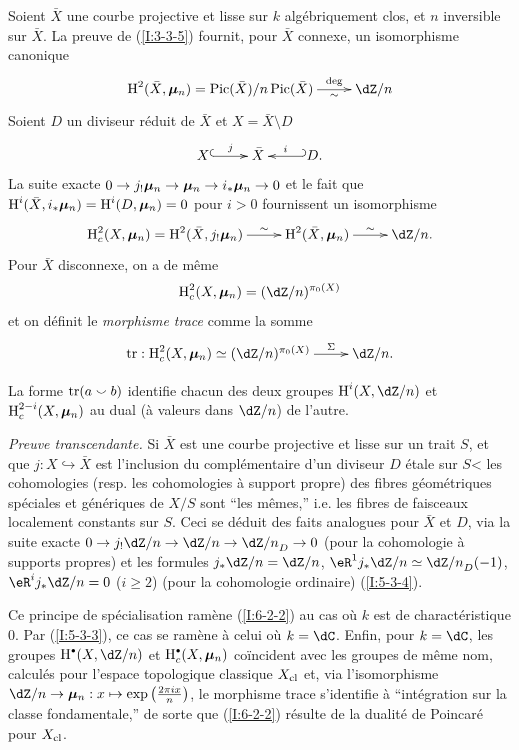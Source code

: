 \subsubsection{}\label{I:6-2-1}

Soient $\bar X$ une courbe projective et lisse sur $k$ algébriquement clos, et 
$n$ inversible sur $\bar X$. La preuve de (\ref{I:3-3-5}) fournit, pour 
$\bar X$ connexe, un isomorphisme canonique 
\[\xymatrix{
  \h^2(\bar X,\dmu_n) = \pic(\bar X)/n\pic(\bar X) \ar[r]^-{\deg}_-{\sim}
    & \dZ/n
}\]
Soient $D$ un diviseur réduit de $\bar X$ et $X=\bar X\setminus D$ 
\[\xymatrix{
  X \ar@{^{(}->}[r]^-j 
    & \bar X 
    & \ar@{_{(}->}[l]_-i D \text{.}
}\]
La suite exacte $0\to j_! {\bm\mu}_n \to {\bm\mu}_n\to i_* {\bm\mu}_n\to 0$ et le fait que 
$\operatorname{H}^i(\bar X,i_*{\bm\mu}_n) = \operatorname{H}^i(D,{\bm\mu}_n)=0$ pour $i>0$ fournissent un 
isomorphisme 
\[\xymatrix{
  \h_c^2(X,\dmu_n) = \h^2(\bar X,j_! \dmu_n) \ar[r]^-\sim 
    & \h^2(\bar X,\dmu_n) \ar[r]^-\sim 
    & \dZ/n \text{.}
}\]
Pour $\bar X$ disconnexe, on a de même 
\[
  \h_c^2(X,\dmu_n) = (\dZ/n)^{\pi_0(X)}
\]
et on définit le \emph{morphisme trace} comme la somme 
\[\xymatrix{
  \tr : \h_c^2(X,\dmu_n) \simeq (\dZ/n)^{\pi_0(X)} \ar[r]^-\Sigma
    & \dZ/n\text{.}
}\]





\begin{theorem}\label{I:6-2-2}
La forme $\operatorname{tr}(a\smallsmile b)$ identifie chacun des deux groupes $\h^i(X,\dZ/n)$ 
et $\operatorname{H}_c^{2-i}(X,{\bm\mu}_n)$ au dual (à valeurs dans $\dZ/n$) de l'autre. 
\end{theorem}

\emph{Preuve transcendante.} Si $\bar X$ est une courbe projective et lisse sur 
un trait $S$, et que $j:X\hookrightarrow \bar X$ est l'inclusion du 
complémentaire d'un diviseur $D$ étale sur $S$< les cohomologies (resp. 
les cohomologies à support propre) des fibres géométriques spéciales et 
génériques de $X/S$ sont ``les mêmes,'' i.e. les fibres de faisceaux 
localement constants sur $S$. Ceci se déduit des faits analogues pour 
$\bar X$ et $D$, via la suite exacte $0\to j_! \dZ/n\to\dZ/n\to {\dZ/n}_D\to 0$ 
(pour la cohomologie à supports propres) et les formules $j_*\dZ/n = \dZ/n$, 
$\eR^1 j_* \dZ/n \simeq {\dZ/n}_D(-1)$, $\eR^i j_*\dZ/n = 0$ ($i\geqslant 2$) 
(pour la cohomologie ordinaire) (\ref{I:5-3-4}). 

Ce principe de spécialisation ramène (\ref{I:6-2-2}) au cas où $k$ est de 
charactéristique $0$. Par (\ref{I:5-3-3}), ce cas se ramène à celui où 
$k=\dC$. Enfin, pour $k=\dC$, les groupes $\h^\bullet(X,\dZ/n)$ et 
$\h_c^\bullet(X,\dmu_n)$ coïncident avec les groupes de même nom, calculés 
pour l'espace topologique classique $X_{\textnormal{cl}}$ et, via 
l'isomorphisme $\dZ/n\to \dmu_n: x\mapsto \exp\left(\frac{2\pi i x}{n}\right)$, 
le morphisme trace s'identifie à ``intégration sur la classe fondamentale,'' 
de sorte que (\ref{I:6-2-2}) résulte de la dualité de Poincaré pour 
$X_{\textnormal{cl}}$. 





